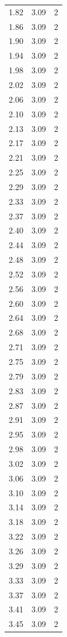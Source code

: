 \begin{longtable}{lrr}
  1.82 & 3.09 & 2 \\
  1.86 & 3.09 & 2 \\
  1.90 & 3.09 & 2 \\
  1.94 & 3.09 & 2 \\
  1.98 & 3.09 & 2 \\
  2.02 & 3.09 & 2 \\
  2.06 & 3.09 & 2 \\
  2.10 & 3.09 & 2 \\
  2.13 & 3.09 & 2 \\
  2.17 & 3.09 & 2 \\
  2.21 & 3.09 & 2 \\
  2.25 & 3.09 & 2 \\
  2.29 & 3.09 & 2 \\
  2.33 & 3.09 & 2 \\
  2.37 & 3.09 & 2 \\
  2.40 & 3.09 & 2 \\
  2.44 & 3.09 & 2 \\
  2.48 & 3.09 & 2 \\
  2.52 & 3.09 & 2 \\
  2.56 & 3.09 & 2 \\
  2.60 & 3.09 & 2 \\
  2.64 & 3.09 & 2 \\
  2.68 & 3.09 & 2 \\
  2.71 & 3.09 & 2 \\
  2.75 & 3.09 & 2 \\
  2.79 & 3.09 & 2 \\
  2.83 & 3.09 & 2 \\
  2.87 & 3.09 & 2 \\
  2.91 & 3.09 & 2 \\
  2.95 & 3.09 & 2 \\
  2.98 & 3.09 & 2 \\
  3.02 & 3.09 & 2 \\
  3.06 & 3.09 & 2 \\
  3.10 & 3.09 & 2 \\
  3.14 & 3.09 & 2 \\
  3.18 & 3.09 & 2 \\
  3.22 & 3.09 & 2 \\
  3.26 & 3.09 & 2 \\
  3.29 & 3.09 & 2 \\
  3.33 & 3.09 & 2 \\
  3.37 & 3.09 & 2 \\
  3.41 & 3.09 & 2 \\
  3.45 & 3.09 & 2 \\

\end{longtable}
